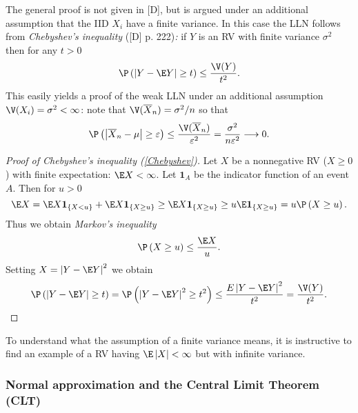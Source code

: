 The general proof is not given in [D], but is argued under an additional
assumption that the IID $X_{i}$ have a finite variance. In this case the
LLN follows from \textit{Chebyshev's inequality }([D] p. 222)\textit{: }if $%
Y $ is an RV with finite variance $\sigma ^{2}$ then for any $t>0$ \textit{%
\ }%
\begin{equation}
\P \left( \left\vert Y-\E Y\right\vert \geq t\right) \leq \frac{\V%
(Y)}{t^{2}}.  \label{Chebyshev}
\end{equation}%
This easily yields a proof of the weak LLN under an additional assumption $%
\V(X_{i})=\sigma ^{2}<\infty $: note that $\V(\overline{X}%
_{n})=\sigma ^{2}/n$ so that 
\begin{equation*}
\P \left( \left\vert \overline{X}_{n}-\mu \right\vert \geq \varepsilon \right)
\leq \frac{\V(\overline{X}_{n})}{\varepsilon ^{2}}=\frac{\sigma ^{2}}{%
n\varepsilon ^{2}}\longrightarrow 0.
\end{equation*}

\begin{proof}[Proof of Chebyshev's inequality (\protect\ref{Chebyshev})]
Let $X$ be a nonnegative RV ($X\geq 0$ ) with finite expectation: $%
\E X<\infty $. Let $\mathbf{1}_{A}$ be the indicator function of an event $A$.
Then for $u>0$ 
\begin{equation*}
\E X=\E X\mathbf{1}_{\left\{ X<u\right\} }+\E X\mathbf{1}_{\left\{ X\geq u\right\}
}\geq \E X\mathbf{1}_{\left\{ X\geq u\right\} }\geq u \E \mathbf{1}_{\left\{
X\geq u\right\} }=u\P \left( X\geq u\right) .
\end{equation*}%
Thus we obtain \textit{Markov's inequality} 
\begin{equation*}
\P \left( X\geq u\right) \leq \frac{\E X}{u}.
\end{equation*}%
Setting $X=\left\vert Y-\E Y\right\vert ^{2}$ we obtain 
\begin{equation*}
\P \left( \left\vert Y-\E Y\right\vert \geq t\right) =\P \left( \left\vert
Y-\E Y\right\vert ^{2}\geq t^{2}\right) \leq \frac{E\left\vert Y-\E Y\right\vert
^{2}}{t^{2}}=\frac{\V(Y)}{t^{2}}.
\end{equation*}
\end{proof}

\bigskip \bigskip To understand what the assumption of a finite variance
means, it is instructive to find an example of a RV having $\E\left\vert
X\right\vert <\infty $ but with infinite variance.

\subsubsection{Normal approximation and the Central Limit Theorem (CLT)}

